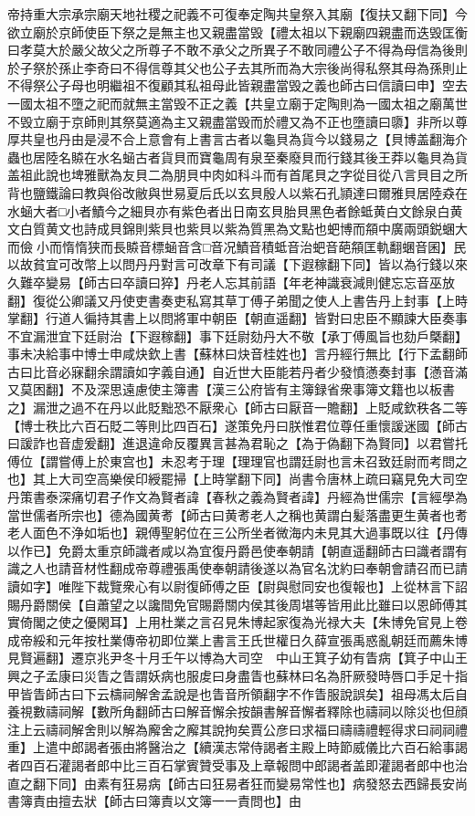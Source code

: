 帝持重大宗承宗廟天地社稷之祀義不可復奉定陶共皇祭入其廟【復扶又翻下同】今欲立廟於京師使臣下祭之是無主也又親盡當毁【禮太祖以下親廟四親盡而迭毁匡衡曰孝莫大於嚴父故父之所尊子不敢不承父之所異子不敢同禮公子不得為母信為後則於子祭於孫止李奇曰不得信尊其父也公子去其所而為大宗後尚得私祭其母為孫則止不得祭公子母也明繼祖不復顧其私祖母此皆親盡當毁之義也師古曰信讀曰申】空去一國太祖不墮之祀而就無主當毁不正之義【共皇立廟于定陶則為一國太祖之廟萬世不毁立廟于京師則其祭莫適為主又親盡當毁而於禮又為不正也墮讀曰隳】非所以尊厚共皇也丹由是浸不合上意會有上書言古者以龜貝為貨今以錢易之【貝博盖翻海介蟲也居陸名贆在水名蜬古者貨貝而寶龜周有泉至秦廢貝而行錢其後王莽以龜貝為貨盖祖此說也埤雅獸為友貝二為朋貝中肉如科斗而有首尾貝之字從目從八言貝目之所背也鹽鐵論曰教與俗改敝與世易夏后氏以玄貝殷人以紫石孔頴達曰爾雅貝居陸猋在水蜬大者□小者鰿今之細貝亦有紫色者出日南玄貝胎貝黑色者餘蚳黄白文餘泉白黄文白質黄文也詩成貝錦則紫貝也紫貝以紫為質黑為文點也蚆博而頯中廣兩頭鋭蜠大而儉小而惰惰狭而長贆音標蜬音含□音况鰿音積蚳音治蚆音葩頯匡軌翻蜠音囷】民以故貧宜可改幣上以問丹丹對言可改章下有司議【下遐稼翻下同】皆以為行錢以來久難卒變易【師古曰卒讀曰猝】丹老人忘其前語【年老神識衰減則健忘忘音巫放翻】復從公卿議又丹使吏書奏吏私寫其草丁傅子弟聞之使人上書告丹上封事【上時掌翻】行道人徧持其書上以問將軍中朝臣【朝直遥翻】皆對曰忠臣不顯諫大臣奏事不宜漏泄宜下廷尉治【下遐稼翻】事下廷尉劾丹大不敬【承丁傅風旨也劾戶槩翻】事未决給事中博士申咸炔欽上書【蘇林曰炔音桂姓也】言丹經行無比【行下孟翻師古曰比音必寐翻余謂讀如字義自通】自近世大臣能若丹者少發憤懣奏封事【懣音滿又莫困翻】不及深思遠慮使主簿書【漢三公府皆有主簿録省衆事簿文籍也以板書之】漏泄之過不在丹以此貶黜恐不厭衆心【師古曰厭音一贍翻】上貶咸欽秩各二等【博士秩比六百石貶二等則比四百石】遂策免丹曰朕惟君位尊任重懷諼迷國【師古曰諼詐也音虚爰翻】進退違命反覆異言甚為君恥之【為于偽翻下為賢同】以君嘗托傅位【謂嘗傅上於東宫也】未忍考于理【理理官也謂廷尉也言未召致廷尉而考問之也】其上大司空高樂侯印綬罷掃【上時掌翻下同】尚書令唐林上疏曰竊見免大司空丹策書泰深痛切君子作文為賢者諱【春秋之義為賢者諱】丹經為世儒宗【言經學為當世儒者所宗也】德為國黄耉【師古曰黄耉老人之稱也黄謂白髪落盡更生黄者也耉老人面色不浄如垢也】親傅聖躬位在三公所坐者微海内未見其大過事既以往【丹傳以作已】免爵太重京師識者咸以為宜復丹爵邑使奉朝請【朝直遥翻師古曰識者謂有識之人也請音材性翻成帝尊禮張禹使奉朝請後遂以為官名沈約曰奉朝會請召而已請讀如字】唯陛下裁覽衆心有以尉復師傅之臣【尉與慰同安也復報也】上從林言下詔賜丹爵關侯【自蕭望之以讒間免官賜爵關内侯其後周堪等皆用此比雖曰以恩師傅其實倚閣之使之優閑耳】上用杜業之言召見朱博起家復為光禄大夫【朱博免官見上卷成帝綏和元年按杜業傳帝初即位業上書言王氏世權日久薛宣張禹惑亂朝廷而薦朱博見賢遍翻】遷京兆尹冬十月壬午以博為大司空　中山王箕子幼有眚病【箕子中山王興之子孟康曰災眚之眚謂妖病也服䖍曰身盡眚也蘇林曰名為肝厥發時唇口手足十指甲皆眚師古曰下云檮祠解舍孟說是也眚音所領翻字不作眚服說誤矣】祖母馮太后自養視數禱祠解【數所角翻師古曰解音懈余按韻書解音懈者釋除也禱祠以除災也但顔注上云禱祠解舍則以解為廨舍之廨其說拘矣賈公彦曰求福曰禱禱禮輕得求曰祠祠禮重】上遣中郎謁者張由將醫治之【續漢志常侍謁者主殿上時節威儀比六百石給事謁者四百石灌謁者郎中比三百石掌賓贊受事及上章報問中郎謁者盖即灌謁者郎中也治直之翻下同】由素有狂易病【師古曰狂易者狂而變易常性也】病發怒去西歸長安尚書簿責由擅去狀【師古曰簿責以文簿一一責問也】由